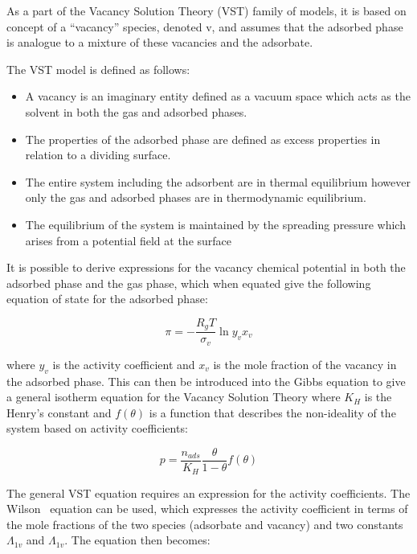 As a part of the Vacancy Solution Theory (VST) family of models, 
it is based on concept of a “vacancy” species, denoted v, and 
assumes that the adsorbed phase is analogue to a mixture of these
vacancies and the adsorbate. 

The VST model is defined as follows:

\begin{itemize}

	\item A vacancy is an imaginary entity defined as a vacuum
	      space which acts as the solvent in both the gas and adsorbed
	      phases.
	\item The properties of the adsorbed phase are defined as
	      excess properties in relation to a dividing surface.
	\item The entire system including the adsorbent are in
	      thermal equilibrium however only the gas and adsorbed phases are in
	      thermodynamic equilibrium.
	\item The equilibrium of the system is maintained by the
	      spreading pressure
	      which arises from a potential field at the surface

\end{itemize}

It is possible to derive expressions for the vacancy chemical
potential in both the adsorbed phase and the gas phase, which when
equated give the following equation of state for the adsorbed phase:

\begin{equation}
	\pi = - \frac{R_g T}{\sigma_v} \ln{y_v x_v}
\end{equation}

where \(y_v\) is the activity coefficient and  \(x_v\) is the mole
fraction of the vacancy in the adsorbed phase.
This can then be introduced into the Gibbs equation to give a general
isotherm equation for the Vacancy Solution Theory where \(K_H\) 
is the Henry’s constant and
\(f(\theta)\) is a function that describes the non-ideality of the
system based on activity coefficients:

\begin{equation}
	p = \frac{n_{ads}}{K_H} \frac{\theta}{1-\theta} f(\theta)
\end{equation}

The general VST equation requires an expression for the activity
coefficients. The Wilson~\cite{suwanayuenGasAdsorptionIsotherm1980} 
equation can be used, which expresses the activity coefficient in terms
of the mole fractions of the two species (adsorbate and vacancy) and
two constants \(\Lambda_{1v}\) and \(\Lambda_{1v}\). The equation
then becomes:

